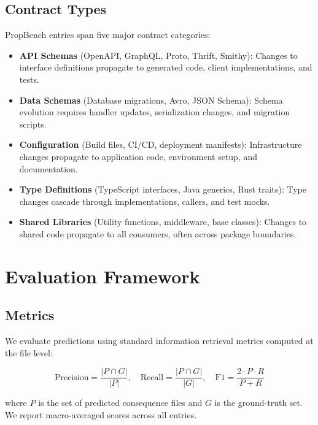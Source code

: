 \documentclass[sigconf,nonacm]{acmart}
\begin{document}
\subsection{Contract Types}

PropBench entries span five major contract categories:
\begin{itemize}
    \item \textbf{API Schemas} (OpenAPI, GraphQL, Proto, Thrift, Smithy): Changes to interface definitions propagate to generated code, client implementations, and tests.
    \item \textbf{Data Schemas} (Database migrations, Avro, JSON Schema): Schema evolution requires handler updates, serialization changes, and migration scripts.
    \item \textbf{Configuration} (Build files, CI/CD, deployment manifests): Infrastructure changes propagate to application code, environment setup, and documentation.
    \item \textbf{Type Definitions} (TypeScript interfaces, Java generics, Rust traits): Type changes cascade through implementations, callers, and test mocks.
    \item \textbf{Shared Libraries} (Utility functions, middleware, base classes): Changes to shared code propagate to all consumers, often across package boundaries.
\end{itemize}

\section{Evaluation Framework}
\label{sec:eval}

\subsection{Metrics}

We evaluate predictions using standard information retrieval metrics computed at the file level:

\begin{equation}
\text{Precision} = \frac{|P \cap G|}{|P|}, \quad
\text{Recall} = \frac{|P \cap G|}{|G|}, \quad
\text{F1} = \frac{2 \cdot P \cdot R}{P + R}
\end{equation}

where $P$ is the set of predicted consequence files and $G$ is the ground-truth set. We report macro-averaged scores across all entries.
\end{document}
